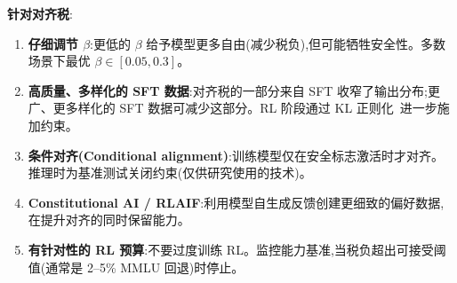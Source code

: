\textbf{针对对齐税}:

\begin{enumerate}
  \item \textbf{仔细调节 $\beta$}:更低的 $\beta$ 给予模型更多自由(减少税负),但可能牺牲安全性。多数场景下最优 $\beta \in [0.05, 0.3]$。
  \item \textbf{高质量、多样化的 SFT 数据}:对齐税的一部分来自 SFT 收窄了输出分布;更广、更多样化的 SFT 数据可减少这部分。RL 阶段通过 KL 正则化~\cite{ouyang2022training}进一步施加约束。
  \item \textbf{条件对齐(Conditional alignment)}:训练模型仅在安全标志激活时才对齐。推理时为基准测试关闭约束(仅供研究使用的技术)。
  \item \textbf{Constitutional AI / RLAIF}:利用模型自生成反馈创建更细致的偏好数据,在提升对齐的同时保留能力。
  \item \textbf{有针对性的 RL 预算}:不要过度训练 RL。监控能力基准,当税负超出可接受阈值(通常是 2--5\% MMLU 回退)时停止。
\end{enumerate}

